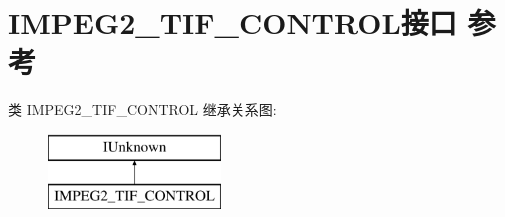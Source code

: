 \hypertarget{interface_i_m_p_e_g2___t_i_f___c_o_n_t_r_o_l}{}\section{I\+M\+P\+E\+G2\+\_\+\+T\+I\+F\+\_\+\+C\+O\+N\+T\+R\+O\+L接口 参考}
\label{interface_i_m_p_e_g2___t_i_f___c_o_n_t_r_o_l}
类 I\+M\+P\+E\+G2\+\_\+\+T\+I\+F\+\_\+\+C\+O\+N\+T\+R\+OL 继承关系图\+:\begin{figure}[H]
\begin{center}
\leavevmode
\includegraphics[height=2.000000cm]{interface_i_m_p_e_g2___t_i_f___c_o_n_t_r_o_l}
\end{center}
\end{figure}
